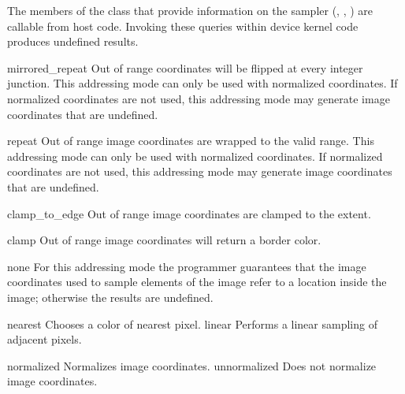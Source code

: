 The members of the  class that provide information on the sampler (, , ) are callable from host code.  Invoking these queries within device kernel code produces undefined results.




  \addRow
  {mirrored_repeat}
  {
    Out of range coordinates will be flipped at every integer junction. This addressing mode
    can only be used with normalized coordinates. If normalized coordinates are not used, this
    addressing mode may generate image coordinates that are undefined.
  }

  \addRow
  {repeat}
  {
    Out of range image coordinates are wrapped to the valid range. This addressing mode can only
    be used with normalized coordinates. If normalized coordinates are not used, this
    addressing mode may generate image coordinates that are undefined.
  }

  \addRow
  {clamp_to_edge}
  {
    Out of range image coordinates are clamped to the extent.
  }

  \addRow
  {clamp}
  {
    Out of range image coordinates will return a border color.
  }

  \addRow
  {none}
  {
    For this addressing mode the programmer guarantees that the image coordinates used to
    sample elements of the image refer to a location inside the image; otherwise the results are
    undefined.
  }
\completeTable

  \addRow
  {nearest}
  {
    Chooses a color of nearest pixel.
  }
  \addRow
  {linear}
  {
    Performs a linear sampling of adjacent pixels.
  }
\completeTable

  \addRow
  {normalized}
  {
    Normalizes image coordinates.
  }
  \addRow
  {unnormalized}
  {
    Does not normalize image coordinates.
  }
\completeTable

